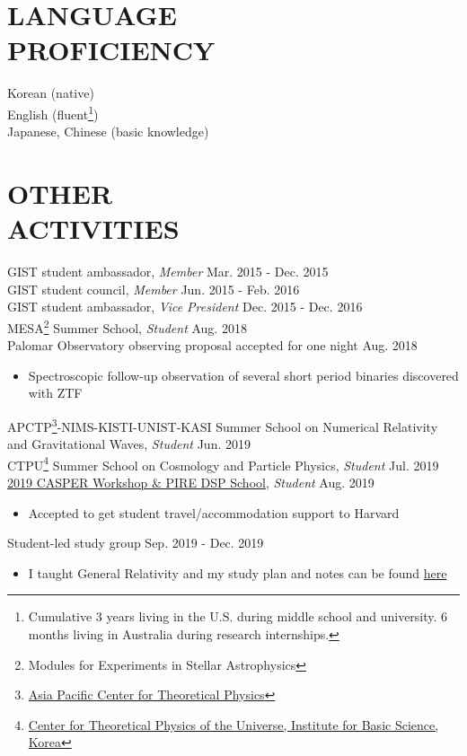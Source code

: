 \documentclass[margin, 10pt]{res} %
\begin{document}
\begin{resume}
\section{LANGUAGE \\ PROFICIENCY} 

Korean (native) \\
English (fluent\footnote{Cumulative 3 years living in the U.S. during middle school and university. 6 months living in Australia during research internships.}) \\
Japanese, Chinese (basic knowledge) \\
 


\section{OTHER \\ ACTIVITIES} 

GIST student ambassador, {\sl Member} \hfill Mar. 2015 - Dec. 2015\\
GIST student council, {\sl Member} \hfill Jun. 2015 - Feb. 2016\\
GIST student ambassador, {\sl Vice President} \hfill Dec. 2015 - Dec. 2016 \\
MESA\footnote{Modules for Experiments in Stellar Astrophysics} Summer School, {\sl Student} \hfill Aug. 2018 \\
Palomar Observatory observing proposal accepted for one night \hfill Aug. 2018
\begin{itemize}
\item[] Spectroscopic follow-up observation of several short period binaries discovered with ZTF
\end{itemize}
APCTP\footnote{\href{https://www.apctp.org/main/}{Asia Pacific Center for Theoretical Physics}}-NIMS-KISTI-UNIST-KASI Summer School on Numerical Relativity and Gravitational Waves, {\sl Student} \hfill Jun. 2019 \\
CTPU\footnote{\href{https://ctpu.ibs.re.kr/html/ctpu_en/}{Center for Theoretical Physics of the Universe, Institute for Basic Science, Korea}}  Summer School on Cosmology and Particle Physics, {\sl Student} \hfill Jul. 2019 \\
\href{https://www.cfa.harvard.edu/events/2019/casper/index.html}{2019 CASPER Workshop \& PIRE DSP School}, {\sl Student} \hfill Aug. 2019
\begin{itemize}
\item[] Accepted to get student travel/accommodation support to Harvard
\end{itemize}
Student-led study group \hfill Sep. 2019 - Dec. 2019
\begin{itemize}
    \item[] I taught General Relativity and my study plan and notes can be found \href{https://docs.google.com/spreadsheets/d/148MdZeH7q8QX9hl4hwpG867U84EG6tA_QnvUUvUCtcQ/edit?usp=sharing}{here}
\end{itemize}



\end{resume}
\end{document}
